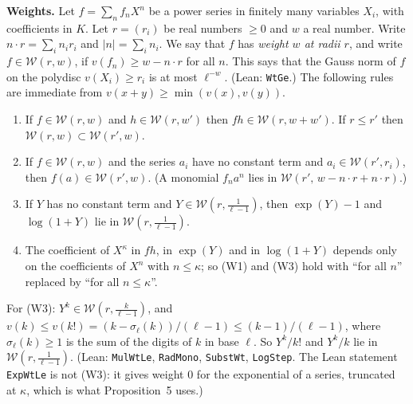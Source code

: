 \documentclass[11pt,letterpaper]{article}
\begin{document}
\textbf{Weights.} Let $f=\sum_nf_nX^n$ be a power series in finitely many variables $X_i$, with
coefficients in $K$. Let $r=(r_i)$ be real numbers $\ge0$ and $w$ a real number. Write $n\cdot r=\sum_in_ir_i$
and $|n|=\sum_in_i$. We say that $f$ has \emph{weight $w$ at radii $r$}, and write $f\in\mathcal W(r,w)$, if
$v(f_n)\ge w-n\cdot r$ for all $n$. This says that the Gauss norm of $f$ on the polydisc $v(X_i)\ge r_i$ is
at most $\ell^{-w}$. (Lean: \texttt{WtGe}.) The following rules are immediate from $v(x+y)\ge\min(v(x),v(y))$.
\begin{enumerate}[label=\textup{(W\arabic*)},leftmargin=3.2em]
\item If $f\in\mathcal W(r,w)$ and $h\in\mathcal W(r,w')$ then $fh\in\mathcal W(r,w+w')$. If $r\le r'$ then
$\mathcal W(r,w)\subset\mathcal W(r',w)$.
\item If $f\in\mathcal W(r,w)$ and the series $a_i$ have no constant term and $a_i\in\mathcal W(r',r_i)$,
then $f(a)\in\mathcal W(r',w)$. (A monomial $f_na^n$ lies in $\mathcal W(r',\,w-n\cdot r+n\cdot r)$.)
\item If $Y$ has no constant term and $Y\in\mathcal W(r,\frac1{\ell-1})$, then
$\exp(Y)-1$ and $\log(1+Y)$ lie in $\mathcal W(r,\frac1{\ell-1})$.
\item The coefficient of $X^\kappa$ in $fh$, in $\exp(Y)$ and in $\log(1+Y)$ depends only on the
coefficients of $X^n$ with $n\le\kappa$; so (W1) and (W3) hold with ``for all $n$'' replaced by ``for all
$n\le\kappa$''.
\end{enumerate}
For (W3): $Y^k\in\mathcal W(r,\frac k{\ell-1})$, and $v(k)\le v(k!)=(k-\sigma_\ell(k))/(\ell-1)\le(k-1)/(\ell-1)$,
where $\sigma_\ell(k)\ge1$ is the sum of the digits of $k$ in base $\ell$. So $Y^k/k!$ and $Y^k/k$ lie in
$\mathcal W(r,\frac1{\ell-1})$. (Lean: \texttt{MulWtLe}, \texttt{RadMono}, \texttt{SubstWt},
\texttt{LogStep}. The Lean statement \texttt{ExpWtLe} is not (W3): it gives weight $0$ for the exponential
of a series, truncated at $\kappa$, which is what Proposition~5 uses.)
\end{document}
